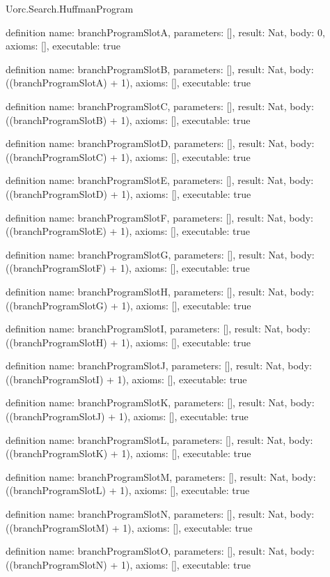 \begin{lexlean}{Uorc.Search.HuffmanProgram}
\begin{semanticmodule}
definition{
  name: branchProgramSlotA,
  parameters: [],
  result: Nat,
  body: 0,
  axioms: [],
  executable: true
}

definition{
  name: branchProgramSlotB,
  parameters: [],
  result: Nat,
  body: ((branchProgramSlotA) + 1),
  axioms: [],
  executable: true
}

definition{
  name: branchProgramSlotC,
  parameters: [],
  result: Nat,
  body: ((branchProgramSlotB) + 1),
  axioms: [],
  executable: true
}

definition{
  name: branchProgramSlotD,
  parameters: [],
  result: Nat,
  body: ((branchProgramSlotC) + 1),
  axioms: [],
  executable: true
}

definition{
  name: branchProgramSlotE,
  parameters: [],
  result: Nat,
  body: ((branchProgramSlotD) + 1),
  axioms: [],
  executable: true
}

definition{
  name: branchProgramSlotF,
  parameters: [],
  result: Nat,
  body: ((branchProgramSlotE) + 1),
  axioms: [],
  executable: true
}

definition{
  name: branchProgramSlotG,
  parameters: [],
  result: Nat,
  body: ((branchProgramSlotF) + 1),
  axioms: [],
  executable: true
}

definition{
  name: branchProgramSlotH,
  parameters: [],
  result: Nat,
  body: ((branchProgramSlotG) + 1),
  axioms: [],
  executable: true
}

definition{
  name: branchProgramSlotI,
  parameters: [],
  result: Nat,
  body: ((branchProgramSlotH) + 1),
  axioms: [],
  executable: true
}

definition{
  name: branchProgramSlotJ,
  parameters: [],
  result: Nat,
  body: ((branchProgramSlotI) + 1),
  axioms: [],
  executable: true
}

definition{
  name: branchProgramSlotK,
  parameters: [],
  result: Nat,
  body: ((branchProgramSlotJ) + 1),
  axioms: [],
  executable: true
}

definition{
  name: branchProgramSlotL,
  parameters: [],
  result: Nat,
  body: ((branchProgramSlotK) + 1),
  axioms: [],
  executable: true
}

definition{
  name: branchProgramSlotM,
  parameters: [],
  result: Nat,
  body: ((branchProgramSlotL) + 1),
  axioms: [],
  executable: true
}

definition{
  name: branchProgramSlotN,
  parameters: [],
  result: Nat,
  body: ((branchProgramSlotM) + 1),
  axioms: [],
  executable: true
}

definition{
  name: branchProgramSlotO,
  parameters: [],
  result: Nat,
  body: ((branchProgramSlotN) + 1),
  axioms: [],
  executable: true
}


\end{semanticmodule}
\end{lexlean}
